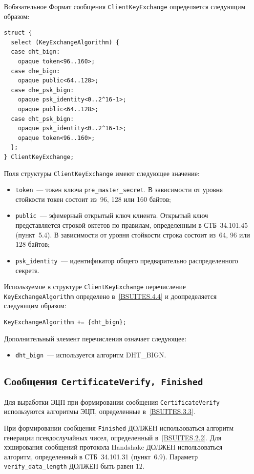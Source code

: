 \begin{appendix}{В}{обязательное}
Формат сообщения \lstinline{ClientKeyExchange} определяется следующим образом:
\begin{lstlisting}
struct {
  select (KeyExchangeAlgorithm) {
  case dht_bign:
    opaque token<96..160>;
  case dhe_bign:
    opaque public<64..128>;
  case dhe_psk_bign:
    opaque psk_identity<0..2^16-1>;
    opaque public<64..128>;
  case dht_psk_bign:
    opaque psk_identity<0..2^16-1>;
	opaque token<96..160>;
  };
} ClientKeyExchange;
\end{lstlisting}

Поля структуры \lstinline{ClientKeyExchange} имеют следующее значение:
\begin{itemize}
\item [--]
\lstinline{token}~--- токен ключа \lstinline{pre_master_secret}. 
В зависимости от уровня стойкости токен состоит из~96, 128 или 160 байтов; 

\item[--]
\lstinline{public}~--- эфемерный открытый ключ клиента. Открытый 
ключ представляется строкой октетов по правилам, определенным в СТБ~34.101.45 
(пункт~5.4). В зависимости от уровня стойкости строка состоит из~64, 96 
или 128 байтов;  

\item[--]
\lstinline{psk_identity}~--- идентификатор общего предварительно 
распределенного секрета. 
\end{itemize}

Используемое в структуре \lstinline{ClientKeyExchange} перечисление 
\lstinline{KeyExchangeAlgorithm} определено в~\ref{BSUITES.4.4} и доопределяется 
следующим образом: 
\begin{lstlisting}
KeyExchangeAlgorithm += {dht_bign};
\end{lstlisting}

Дополнительный элемент перечисления означает следующее:
\begin{itemize}
\item[--]
\lstinline{dht_bign}~--- используется алгоритм DHT\_BIGN.
\end{itemize}

\subsection{Сообщения \lstinline{CertificateVerify, Finished}}\label{BSUITES.4.9}

Для выработки ЭЦП при формировании сообщения \lstinline{CertificateVerify} 
используются алгоритмы ЭЦП, определенные в~\ref{BSUITES.3.3}.  

При формировании сообщения \lstinline{Finished} ДОЛЖЕН использоваться алгоритм 
генерации псевдослучайных чисел, определенный в~\ref{BSUITES.2.2}. Для хэширования 
сообщений протокола Handshake ДОЛЖЕН использоваться алгоритм, 
определенный в СТБ~34.101.31 (пункт~6.9). Параметр 
\lstinline{verify_data_length} ДОЛЖЕН быть равен 12. 

\end{appendix}
\mbox{}
\vfill
\mbox{}
\clearpage
